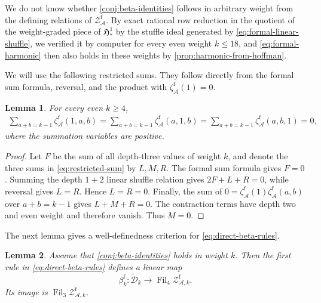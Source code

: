 \documentclass[12pt]{amsart}
\numberwithin{equation}{section}
\theoremstyle{plain}
\newtheorem{lem}[lem]{Lemma}
\DeclareMathOperator{\Fil}{Fil}
\newcommand{\h}{\mathfrak H}
\newcommand{\ZAf}{{\mathcal Z_{\mathcal A}^{\mathrm f}}}
\newcommand{\ZAfw}[1]{{\mathcal Z_{\mathcal A,#1}^{\mathrm f}}}
\newcommand{\zaf}[1]{\zeta_{\mathcal A}^{\mathrm f}(#1)}
\newcommand{\Dtk}{\widetilde{\mathcal D}_k}
\begin{document}
We do not know whether \cref{conj:beta-identities} follows in
arbitrary weight from the defining relations of $\ZAf$. By exact
rational row reduction in the quotient of the weight-graded piece of
$\h^1_*$ by the stuffle ideal generated by
\eqref{eq:formal-linear-shuffle}, we verified it by computer for every
even weight $k\leq18$, and \eqref{eq:formal-harmonic} then also holds in
these weights by \cref{prop:harmonic-from-hoffman}.

We will use the following restricted sums. They follow directly from
the formal sum formula, reversal, and the product with $\zaf1=0$.

\begin{lem}\label{lem:restricted-sum}
For every even $k\geq4$,
\begin{align}\label{eq:restricted-sum}
 \sum_{a+b=k-1}\zaf{1,a,b}
 =\sum_{a+b=k-1}\zaf{a,1,b}
 =\sum_{a+b=k-1}\zaf{a,b,1}=0,
\end{align}
where the summation variables are positive.
\end{lem}

\begin{proof}
Let $F$ be the sum of all depth-three values of weight $k$, and denote
the three sums in \eqref{eq:restricted-sum} by $L,M,R$. The formal sum
formula gives $F=0$. Summing the depth $1+2$ linear shuffle relation
gives $2F+L+R=0$, while reversal gives $L=R$. Hence $L=R=0$.
Finally, the sum of $0=\zaf1\zaf{a,b}$ over $a+b=k-1$ gives
$L+M+R=0$. The contraction terms have depth two and even weight and
therefore vanish. Thus $M=0$.
\end{proof}

The next lemma gives a well-definedness criterion for
\eqref{eq:direct-beta-rules}.

\begin{lem}\label{lem:direct-beta-certificate}
Assume that \cref{conj:beta-identities} holds in weight $k$. Then the
first rule in \eqref{eq:direct-beta-rules} defines a linear map
\[
 \beta_k^{\mathrm f}:\Dtk\longrightarrow\Fil_4\ZAfw{k}.
\]
Its image is $\Fil_3\ZAfw{k}$.
\end{lem}
\end{document}
